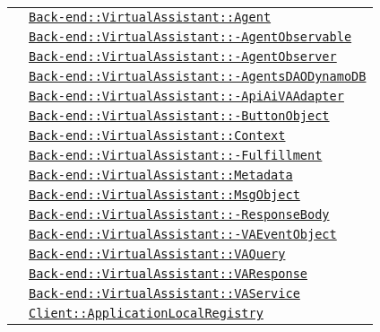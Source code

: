 \begin{longtable}{|>{\centering}m{3cm}|m{10cm}<{\centering}|}
& \hyperref[Back-end::VirtualAssistant::Agent]{\texttt{Back-end::VirtualAssistant::Agent}}\\
& \hyperref[Back-end::VirtualAssistant::AgentObservable]{\texttt{Back-end::VirtualAssistant::-\linebreak AgentObservable}}\\
& \hyperref[Back-end::VirtualAssistant::AgentObserver]{\texttt{Back-end::VirtualAssistant::-\linebreak AgentObserver}}\\
& \hyperref[Back-end::VirtualAssistant::AgentsDAODynamoDB]{\texttt{Back-end::VirtualAssistant::-\linebreak AgentsDAODynamoDB}}\\
& \hyperref[Back-end::VirtualAssistant::ApiAiVAAdapter]{\texttt{Back-end::VirtualAssistant::-\linebreak ApiAiVAAdapter}}\\
& \hyperref[Back-end::VirtualAssistant::ButtonObject]{\texttt{Back-end::VirtualAssistant::-\linebreak ButtonObject}}\\
& \hyperref[Back-end::VirtualAssistant::Context]{\texttt{Back-end::VirtualAssistant::Context}}\\
& \hyperref[Back-end::VirtualAssistant::Fulfillment]{\texttt{Back-end::VirtualAssistant::-\linebreak Fulfillment}}\\
& \hyperref[Back-end::VirtualAssistant::Metadata]{\texttt{Back-end::VirtualAssistant::Metadata}}\\
& \hyperref[Back-end::VirtualAssistant::MsgObject]{\texttt{Back-end::VirtualAssistant::MsgObject}}\\
& \hyperref[Back-end::VirtualAssistant::ResponseBody]{\texttt{Back-end::VirtualAssistant::-\linebreak ResponseBody}}\\
& \hyperref[Back-end::VirtualAssistant::VAEventObject]{\texttt{Back-end::VirtualAssistant::-\linebreak VAEventObject}}\\
& \hyperref[Back-end::VirtualAssistant::VAQuery]{\texttt{Back-end::VirtualAssistant::VAQuery}}\\
& \hyperref[Back-end::VirtualAssistant::VAResponse]{\texttt{Back-end::VirtualAssistant::VAResponse}}\\
& \hyperref[Back-end::VirtualAssistant::VAService]{\texttt{Back-end::VirtualAssistant::VAService}}\\
& \hyperref[Client::ApplicationLocalRegistry]{\texttt{Client::ApplicationLocalRegistry}}\\

\end{longtable}
